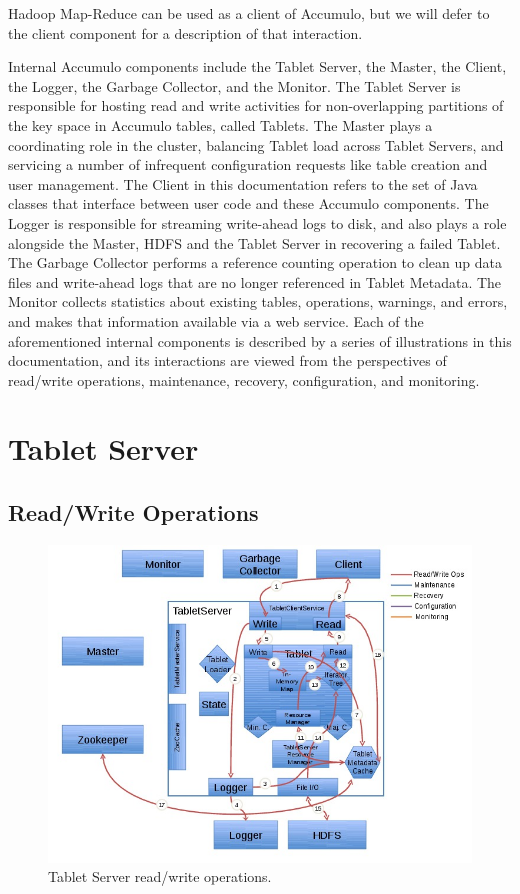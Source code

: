 \documentclass[letterpaper,onecolumn,12pt,titlepage]{article}
\begin{document}
Hadoop Map-Reduce can be used as a client of Accumulo, but we will defer to the client component for a description of that interaction.

Internal Accumulo components include the Tablet Server, the Master, the Client, the Logger, the Garbage Collector, and the Monitor.
The Tablet Server is responsible for hosting read and write activities for non-overlapping partitions of the key space in Accumulo tables, called Tablets.
The Master plays a coordinating role in the cluster, balancing Tablet load across Tablet Servers, and servicing a number of infrequent configuration requests like table creation and user management.
The Client in this documentation refers to the set of Java classes that interface between user code and these Accumulo components.
The Logger is responsible for streaming write-ahead logs to disk, and also plays a role alongside the Master, HDFS and the Tablet Server in recovering a failed Tablet.
The Garbage Collector performs a reference counting operation to clean up data files and write-ahead logs that are no longer referenced in Tablet Metadata.
The Monitor collects statistics about existing tables, operations, warnings, and errors, and makes that information available via a web service.
Each of the aforementioned internal components is described by a series of illustrations in this documentation, and its interactions are viewed from the perspectives of read/write operations, maintenance, recovery, configuration, and monitoring.

\section{Tablet Server}

\subsection{Read/Write Operations}
\begin{figure}[htbp]
\center
\includegraphics[scale=.6]{images/tserver_rw.jpg}
\caption{\label{fig_ts_rw} Tablet Server read/write operations.}
\end{figure}
\end{document}
